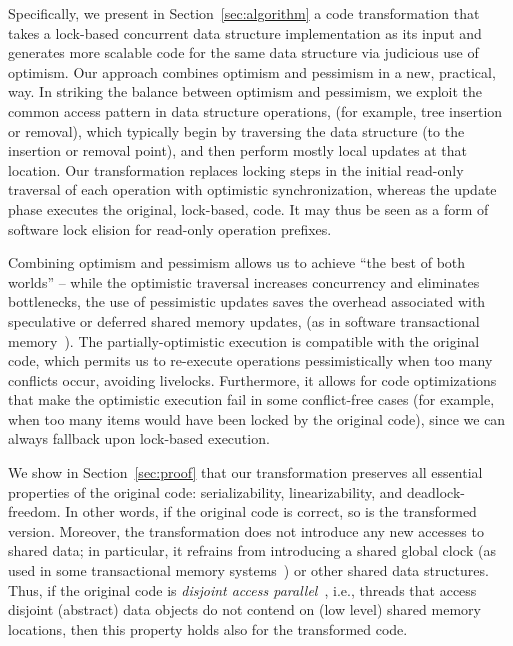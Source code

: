 Specifically, we present in Section~\ref{sec:algorithm}
a code transformation that takes a lock-based concurrent data structure implementation as its input 
and generates more scalable code for the same data structure via judicious use of optimism. 
Our approach combines optimism and pessimism in a new, practical, way. 
In striking the balance between optimism and pessimism, we exploit the common access pattern in data structure operations,
(for example, tree insertion or removal), which typically begin by traversing the data structure (to the insertion or removal point), and then perform mostly local updates at that location.
Our transformation replaces locking steps in the initial read-only traversal of each operation with 
optimistic synchronization, whereas the update phase executes the original, lock-based, code. 
It may thus be seen as a form of software lock elision for read-only operation prefixes.

Combining optimism and pessimism allows us to achieve ``the best of both worlds'' -- while the
optimistic traversal increases concurrency and eliminates bottlenecks, 
the use of pessimistic updates saves the overhead associated with speculative or deferred shared
memory updates, (as in software transactional memory~\cite{HLR:SLCA2010}). 
The partially-optimistic execution is compatible with the original code, which permits us to re-execute operations 
pessimistically when too many conflicts occur, avoiding livelocks. Furthermore, it allows for code optimizations 
that make the optimistic execution fail in some conflict-free cases (for example, when too many items would have been locked
by the original code), since we can always fallback upon lock-based execution.  

We show in Section~\ref{sec:proof} that our transformation preserves all essential properties of the original code: serializability, linearizability, and deadlock-freedom. In other words, if the original code is correct, so is the 
transformed version. Moreover, the transformation does not introduce any new accesses to shared data; in particular, it 
refrains from introducing a shared global clock (as used in some transactional memory systems~\cite{TL2}) or other
shared data structures. Thus, if the original code is \emph{disjoint access parallel}~\cite{dap}, i.e., threads 
that access disjoint (abstract) data objects do not contend on (low level) shared memory locations, then this 
property holds also for the transformed code. 

